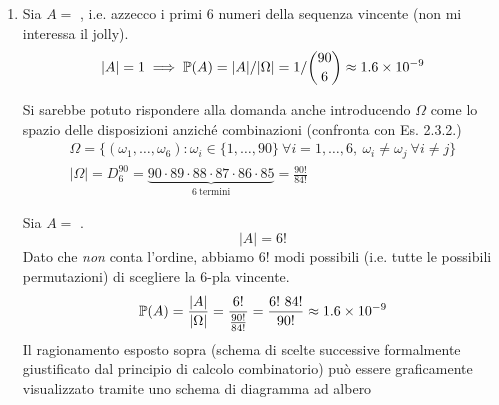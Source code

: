 \begin{enumerate}
	\item Sia $A=$ , i.e. azzecco i primi $6$ numeri della sequenza vincente (non mi interessa il jolly).
	\begin{equation*}
		| A| =1\implies \PP(A) =| A| /| \Omega | =1/\binom{90}{6} \approx 1.6\times 10^{-9}
	\end{equation*}

	\begin{oss}
		Si sarebbe potuto rispondere alla domanda anche introducendo $\Omega $ come lo spazio delle disposizioni anziché combinazioni (confronta con Es. 2.3.2.)
		\begin{gather*}
			\Omega =\{(\omega _{1} ,\dots ,\omega _{6}) :\omega _{i} \in \{1,\dots,90\} \ \forall i=1,\dots,6,\ \omega _{i} \neq \omega _{j} \ \forall i\neq j\}\\
			| \Omega | =D_{6}^{90} =\underbrace{90\cdot 89\cdot 88\cdot 87\cdot 86\cdot 85}_{6\ \text{termini}} =\frac{90!}{84!}
		\end{gather*}
	\end{oss}

	Sia $A=$ .
	\begin{equation*}
		| A| =6!
	\end{equation*}
	Dato che \textit{non} conta l'ordine, abbiamo $6!$ modi possibili (i.e. tutte le possibili permutazioni) di scegliere la $6$-pla vincente.
	\begin{equation*}
		\PP(A) =\frac{| A| }{| \Omega | } =\frac{6!}{\frac{90!}{84!}} =\frac{6!\ 84!}{90!} \approx 1.6\times 10^{-9}
	\end{equation*}
	Il ragionamento esposto sopra (schema di scelte successive formalmente giustificato dal principio di calcolo combinatorio) può essere graficamente visualizzato tramite uno schema di diagramma ad albero


	\begin{tikzpicture}[x=0.75pt,y=0.75pt,yscale=-1,xscale=1]


\end{tikzpicture}
\end{enumerate}
